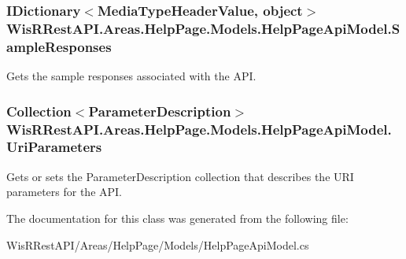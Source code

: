 \hypertarget{class_wis_r_rest_a_p_i_1_1_areas_1_1_help_page_1_1_models_1_1_help_page_api_model_a5e28ca5f607b988f2618122fe265e17a}{}
\subsubsection[{Sample\+Responses}]{\setlength{\rightskip}{0pt plus 5cm}I\+Dictionary$<$Media\+Type\+Header\+Value, object$>$ Wis\+R\+Rest\+A\+P\+I.\+Areas.\+Help\+Page.\+Models.\+Help\+Page\+Api\+Model.\+Sample\+Responses\hspace{0.3cm}{\ttfamily [get]}}\label{class_wis_r_rest_a_p_i_1_1_areas_1_1_help_page_1_1_models_1_1_help_page_api_model_a5e28ca5f607b988f2618122fe265e17a}


Gets the sample responses associated with the A\+P\+I. 

\hypertarget{class_wis_r_rest_a_p_i_1_1_areas_1_1_help_page_1_1_models_1_1_help_page_api_model_ad0307446265c50680d95d924e8d6a2f5}{}
\subsubsection[{Uri\+Parameters}]{\setlength{\rightskip}{0pt plus 5cm}Collection$<${\bf Parameter\+Description}$>$ Wis\+R\+Rest\+A\+P\+I.\+Areas.\+Help\+Page.\+Models.\+Help\+Page\+Api\+Model.\+Uri\+Parameters\hspace{0.3cm}{\ttfamily [get]}}\label{class_wis_r_rest_a_p_i_1_1_areas_1_1_help_page_1_1_models_1_1_help_page_api_model_ad0307446265c50680d95d924e8d6a2f5}


Gets or sets the Parameter\+Description collection that describes the U\+R\+I parameters for the A\+P\+I. 



The documentation for this class was generated from the following file\+:\begin{DoxyCompactItemize}
\item 
Wis\+R\+Rest\+A\+P\+I/\+Areas/\+Help\+Page/\+Models/Help\+Page\+Api\+Model.\+cs\end{DoxyCompactItemize}
